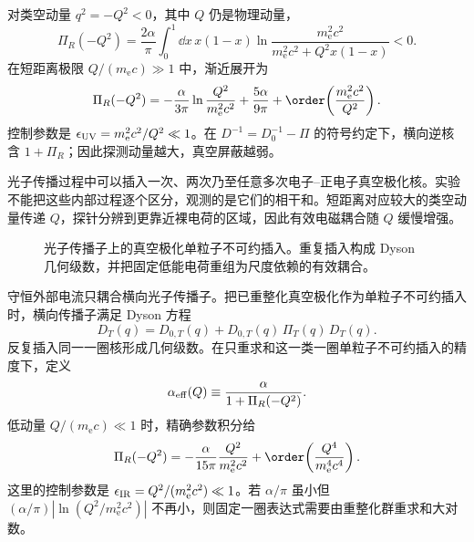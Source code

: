 对类空动量 \(q^2=-Q^2<0\)，其中 \(Q\) 仍是物理动量，
\begin{equation}
 \Pi_R(-Q^2)
 =\frac{2\alpha}{\pi}
 \int_0^1\dd x\,x(1-x)
 \ln\frac{m_{\mathrm e}^2c^2}{m_{\mathrm e}^2c^2+Q^2x(1-x)}<0.
 \label{eq:Pi-spacelike-r12}
\end{equation}
在短距离极限 \(Q/(m_{\mathrm e} c)\gg1\) 中，渐近展开为
\begin{equation}
 {
 \Pi_R(-Q^2)
 =-\frac{\alpha}{3\pi}
 \ln\frac{Q^2}{m_{\mathrm e}^2c^2}
 +\frac{5\alpha}{9\pi}
 +\order\!\left(\frac{m_{\mathrm e}^2c^2}{Q^2}\right).}
 \label{eq:Pi-spacelike-asymptotic-r12}
\end{equation}
控制参数是 \(\epsilon_{\rm UV}=m_{\mathrm e}^2c^2/Q^2\ll1\)。在 \(D^{-1}=D_0^{-1}-\Pi\) 的符号约定下，横向逆核含 \(1+\Pi_R\)；因此探测动量越大，真空屏蔽越弱。

光子传播过程中可以插入一次、两次乃至任意多次电子--正电子真空极化核。实验不能把这些内部过程逐个区分，观测的是它们的相干和。短距离对应较大的类空动量传递 \(Q\)，探针分辨到更靠近裸电荷的区域，因此有效电磁耦合随 \(Q\) 缓慢增强。


\begin{figure}[htbp]
 \centering
 
 \caption{光子传播子上的真空极化单粒子不可约插入。重复插入构成 Dyson 几何级数，并把固定低能电荷重组为尺度依赖的有效耦合。}
 \label{fig:qed-vacpol-dyson-dp7}
\end{figure}

守恒外部电流只耦合横向光子传播子。把已重整化真空极化作为单粒子不可约插入时，横向传播子满足 Dyson 方程
\begin{equation}
 {D_T(q)=D_{0,T}(q)+D_{0,T}(q)\,\Pi_T(q)\,D_T(q).}
 \label{eq:qed-dyson-transverse-r68}
\end{equation}
反复插入同一一圈核形成几何级数。在只重求和这一类一圈单粒子不可约插入的精度下，定义
\begin{equation}
 {
 \alpha_{\rm eff}(Q)
 \equiv
 \frac{\alpha}{1+\Pi_R(-Q^2)}.}
 \label{eq:qed-alpha-effective-dp7}
\end{equation}
低动量 \(Q/(m_{\mathrm e} c)\ll1\) 时，精确参数积分给
\begin{equation}
 {
 \Pi_R(-Q^2)
 =-\frac{\alpha}{15\pi}
 \frac{Q^2}{m_{\mathrm e}^2c^2}
 +\order\!\left(\frac{Q^4}{m_{\mathrm e}^4c^4}\right).}
 \label{eq:qed-pi-smallQ-dp7}
\end{equation}
这里的控制参数是 \(\epsilon_{\rm IR}=Q^2/(m_{\mathrm e}^2c^2)\ll1\)。若 \(\alpha/\pi\) 虽小但 \((\alpha/\pi)|\ln(Q^2/m_{\mathrm e}^2c^2)|\) 不再小，则固定一圈表达式需要由重整化群重求和大对数。

